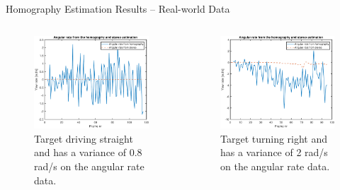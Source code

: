 \documentclass{beamer}
\begin{document}
\begin{frame}{Homography Estimation Results -- Real-world Data}
	\begin{columns}[T]
	\begin{figure}
		\includegraphics[width=\textwidth]{Hom/155532_AngVelComparison}
		\caption{Target driving straight and has a variance of 0.8 rad/s on the angular rate data.}
	\end{figure}
	\begin{figure}
		\includegraphics[width=\textwidth]{Hom/155733_AngVelComparison}
		\caption{Target turning right and has a variance of  2 rad/s on the angular rate data.}
	\end{figure}
	\end{columns}
\end{frame}
\end{document}
